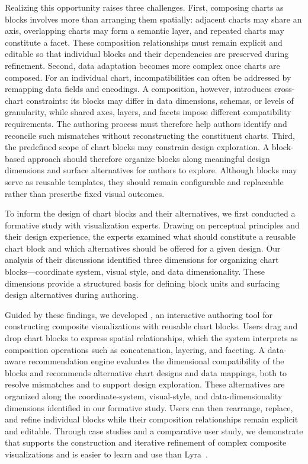 Realizing this opportunity raises three challenges. First, composing charts as
blocks involves more than arranging them spatially: adjacent charts may share
an axis, overlapping charts may form a semantic layer, and repeated charts may
constitute a facet. These composition relationships must remain explicit and
editable so that individual blocks and their dependencies are preserved during
refinement. Second, data adaptation becomes more complex once charts are composed. For an
individual chart, incompatibilities can often be addressed by remapping data
fields and encodings. A composition, however, introduces cross-chart
constraints: its blocks may differ in data dimensions, schemas, or levels of
granularity, while shared axes, layers, and facets impose different
compatibility requirements. The authoring process must therefore help authors
identify and reconcile such mismatches without reconstructing the constituent
charts. Third, the predefined scope of chart blocks may constrain design
exploration. A block-based approach should therefore organize blocks along
meaningful design dimensions and surface alternatives for authors to explore.
Although blocks may serve as reusable templates, they should remain
configurable and replaceable rather than prescribe fixed visual outcomes.

To inform the design of chart blocks and their alternatives, we first
conducted a formative study with visualization experts. Drawing on perceptual
principles and their design experience, the experts examined what should
constitute a reusable chart block and which alternatives should be offered for
a given design. Our analysis of their discussions identified three dimensions
for organizing chart blocks---coordinate system, visual style, and data
dimensionality. These dimensions provide a structured basis for defining block
units and surfacing design alternatives during authoring.

Guided by these findings, we developed {\system}, an interactive
authoring tool for constructing composite visualizations with reusable chart
blocks. Users drag and drop chart blocks to express spatial relationships,
which the system interprets as composition operations such as concatenation,
layering, and faceting. A data-aware recommendation engine evaluates the
dimensional compatibility of the blocks and recommends alternative chart
designs and data mappings, both to resolve mismatches and to support design
exploration. These alternatives are organized along the coordinate-system,
visual-style, and data-dimensionality dimensions identified in our formative
study. Users can then rearrange, replace, and refine individual blocks while
their composition relationships remain explicit and editable. 
Through case studies and a comparative user study, 
we demonstrate that {\system} supports the construction and iterative 
refinement of complex composite visualizations and is easier to learn 
and use than Lyra~\cite{Lyra}.





